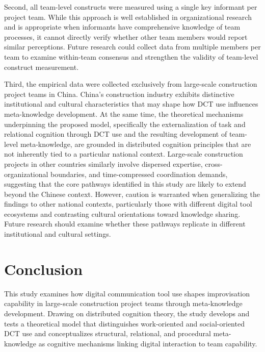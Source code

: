 \documentclass[authoryear,preprint,review,times,10pt]{elsarticle}
\begin{document}
Second, all team-level constructs were measured using a single key informant per project team. While this approach is well established in organizational research and is appropriate when informants have comprehensive knowledge of team processes, it cannot directly verify whether other team members would report similar perceptions. Future research could collect data from multiple members per team to examine within-team consensus and strengthen the validity of team-level construct measurement.

Third, the empirical data were collected exclusively from large-scale construction project teams in China. China's construction industry exhibits distinctive institutional and cultural characteristics that may shape how DCT use influences meta-knowledge development. At the same time, the theoretical mechanisms underpinning the proposed model, specifically the externalization of task and relational cognition through DCT use and the resulting development of team-level meta-knowledge, are grounded in distributed cognition principles that are not inherently tied to a particular national context. Large-scale construction projects in other countries similarly involve dispersed expertise, cross-organizational boundaries, and time-compressed coordination demands, suggesting that the core pathways identified in this study are likely to extend beyond the Chinese context. However, caution is warranted when generalizing the findings to other national contexts, particularly those with different digital tool ecosystems and contrasting cultural orientations toward knowledge sharing. Future research should examine whether these pathways replicate in different institutional and cultural settings.

\section{Conclusion}
This study examines how digital communication tool use shapes improvisation capability in large-scale construction project teams through meta-knowledge development. Drawing on distributed cognition theory, the study develops and tests a theoretical model that distinguishes work-oriented and social-oriented DCT use and conceptualizes structural, relational, and procedural meta-knowledge as cognitive mechanisms linking digital interaction to team capability.
\end{document}
